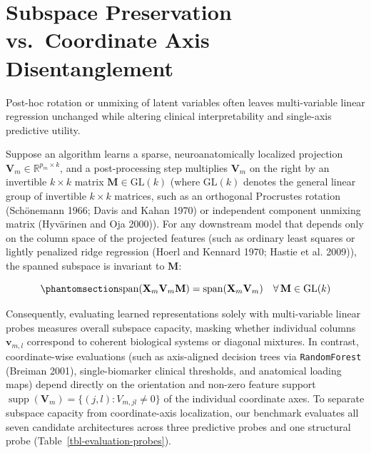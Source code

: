 \documentclass[
  10pt,
  letterpaper,
]{report}
\begin{document}
\section{Subspace Preservation vs.~Coordinate Axis
Disentanglement}\label{subspace-preservation-vs.-coordinate-axis-disentanglement}

Post-hoc rotation or unmixing of latent variables often leaves
multi-variable linear regression unchanged while altering clinical
interpretability and single-axis predictive utility.

Suppose an algorithm learns a sparse, neuroanatomically localized
projection \(\mathbf{V}_m \in \mathbb{R}^{p_m \times k}\), and a
post-processing step multiplies \(\mathbf{V}_m\) on the right by an
invertible \(k \times k\) matrix \(\mathbf{M} \in \mathrm{GL}(k)\)
(where \(\mathrm{GL}(k)\) denotes the general linear group of invertible
\(k \times k\) matrices, such as an orthogonal Procrustes rotation
(Schönemann 1966; Davis and Kahan 1970) or independent component
unmixing matrix (Hyvärinen and Oja 2000)). For any downstream model that
depends only on the column space of the projected features (such as
ordinary least squares or lightly penalized ridge regression (Hoerl and
Kennard 1970; Hastie et al. 2009)), the spanned subspace is invariant to
\(\mathbf{M}\):

\begin{equation}\protect\phantomsection\label{eq-subspace-invariance}{
\operatorname{span}(\mathbf{X}_m \mathbf{V}_m \mathbf{M}) = \operatorname{span}(\mathbf{X}_m \mathbf{V}_m) \quad \forall \, \mathbf{M} \in \mathrm{GL}(k)
}\end{equation}

Consequently, evaluating learned representations solely with
multi-variable linear probes measures overall subspace capacity, masking
whether individual columns \(\mathbf{v}_{m,l}\) correspond to coherent
biological systems or diagonal mixtures. In contrast, coordinate-wise
evaluations (such as axis-aligned decision trees via
\texttt{RandomForest} (Breiman 2001), single-biomarker clinical
thresholds, and anatomical loading maps) depend directly on the
orientation and non-zero feature support
\(\operatorname{supp}(\mathbf{V}_m) = \{(j, l) : V_{m,jl} \neq 0\}\) of
the individual coordinate axes. To separate subspace capacity from
coordinate-axis localization, our benchmark evaluates all seven
candidate architectures across three predictive probes and one
structural probe (Table~\ref{tbl-evaluation-probes}).
\end{document}

